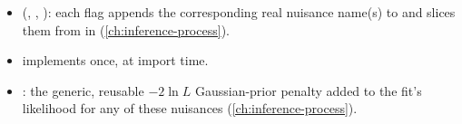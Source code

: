 \begin{implbox}
\begin{itemize}
  \item {}(,
    , ): each flag appends the
    corresponding real nuisance name(s) to  and slices them
    from  in  (\cref{ch:inference-process}).
  \item {}
    implements  once, at import time.
  \item {}: the generic, reusable $-2\ln L$ Gaussian-prior penalty
    added to the fit's likelihood for any of these nuisances
    (\cref{ch:inference-process}).
\end{itemize}
\end{implbox}
